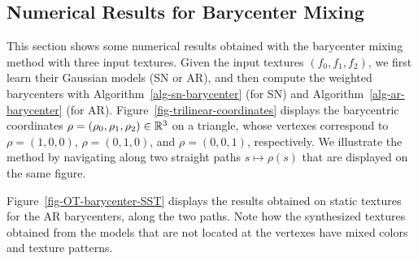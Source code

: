 
\subsection{Numerical Results for Barycenter Mixing}

This section shows some numerical results obtained with the barycenter mixing method with three input textures. Given the input textures $(f_0,f_1,f_2)$, we first learn their Gaussian models (SN or AR), and then compute the weighted barycenters with Algorithm~\ref{alg-sn-barycenter} (for SN) and Algorithm~\ref{alg-ar-barycenter} (for AR).  Figure~\ref{fig-trilinear-coordinates} displays the barycentric coordinates $\rho = (\rho_0, \rho_1, \rho_2) \in \mathbb{R}^3$ on a triangle, whose vertexes correspond to $\rho = (1,0,0)$, $\rho = (0,1,0)$, and $\rho = (0,0,1)$, respectively. We illustrate the method by navigating along two straight paths $s \mapsto \rho(s)$ that are displayed on the same figure.

Figure~\ref{fig-OT-barycenter-SST} displays the results obtained on static textures for the AR barycenters, along the two paths.
Note how the synthesized textures obtained from the models that are not located at the vertexes have mixed colors and texture patterns.



